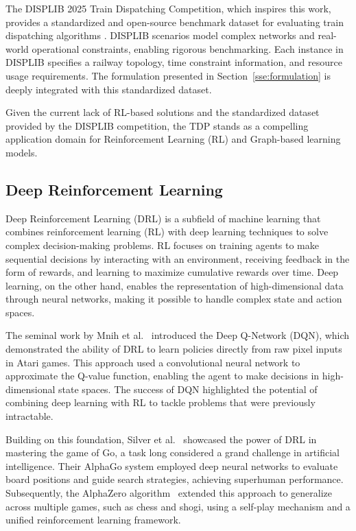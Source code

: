 \documentclass[runningheads]{llncs}
\begin{document}
The DISPLIB 2025 Train Dispatching Competition, which inspires this work, provides a standardized and open-source benchmark dataset for evaluating train dispatching algorithms \cite{train:DISPLIB2025}. 
DISPLIB scenarios model complex networks and real-world operational constraints, enabling rigorous benchmarking. 
Each instance in DISPLIB specifies a railway topology, time constraint information, and resource usage requirements. 
The formulation presented in Section~\ref{sse:formulation} is deeply integrated with this standardized dataset.

Given the current lack of RL-based solutions and the standardized dataset provided by the DISPLIB competition, the TDP stands as a compelling application domain for Reinforcement Learning (RL) and Graph-based learning models.

\subsection{Deep Reinforcement Learning}
\label{sss:reinforcement_learning}
Deep Reinforcement Learning (DRL) is a subfield of machine learning that combines reinforcement learning (RL) with deep learning techniques to solve complex decision-making problems. 
RL focuses on training agents to make sequential decisions by interacting with an environment, receiving feedback in the form of rewards, and learning to maximize cumulative rewards over time. 
Deep learning, on the other hand, enables the representation of high-dimensional data through neural networks, making it possible to handle complex state and action spaces.

The seminal work by Mnih et al.~\cite{drl:Mnih13} introduced the Deep Q-Network (DQN), which demonstrated the ability of DRL to learn policies directly from raw pixel inputs in Atari games. 
This approach used a convolutional neural network to approximate the Q-value function, enabling the agent to make decisions in high-dimensional state spaces. 
The success of DQN highlighted the potential of combining deep learning with RL to tackle problems that were previously intractable.

Building on this foundation, Silver et al.~\cite{drl:silver2017mastering} showcased the power of DRL in mastering the game of Go, a task long considered a grand challenge in artificial intelligence. 
Their AlphaGo system employed deep neural networks to evaluate board positions and guide search strategies, achieving superhuman performance. 
Subsequently, the AlphaZero algorithm~\cite{drl:silver2017alphazero} extended this approach to generalize across multiple games, such as chess and shogi, using a self-play mechanism and a unified reinforcement learning framework.
\end{document}
